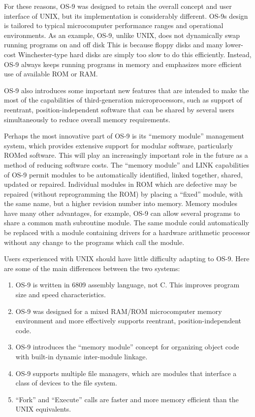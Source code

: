 \documentclass[
]{article}
\begin{document}
For these reasons, OS-9 was designed to retain the overall concept and
user interface of UNIX, but its implementation is considerably
different. OS-9\textquotesingle s design is tailored to typical
microcomputer performance ranges and operational environments. As an
example, OS-9, unlike UNIX, does not dynamically swap running programs
on and off disk This is because floppy disks and many lower-cost
Winchester-type hard disks are simply too slow to do this efficiently.
Instead, OS-9 always keeps running programs in memory and emphasizes
more efficient use of available ROM or RAM.

OS-9 also introduces some important new features that are intended to
make the most of the capabilities of third-generation microprocessors,
such as support of reentrant, position-independent software that can be
shared by several users simultaneously to reduce overall memory
requirements.

Perhaps the most innovative part of OS-9 is its ``memory module''
management system, which provides extensive support for modular
software, particularly ROMed software. This will play an increasingly
important role in the future as a method of reducing software costs. The
``memory module'' and LINK capabilities of OS-9 permit modules to be
automatically identified, linked together, shared, updated or repaired.
Individual modules in ROM which are defective may be repaired (without
reprogramming the ROM) by placing a ``fixed'' module, with the same
name, but a higher revision number into memory. Memory modules have many
other advantages, for example, OS-9 can allow several programs to share
a common math subroutine module. The same module could automatically be
replaced with a module containing drivers for a hardware arithmetic
processor without any change to the programs which call the module.

Users experienced with UNIX should have little difficulty adapting to
OS-9. Here are some of the main differences between the two systems:

\begin{enumerate}
\def\labelenumi{\arabic{enumi}.}
\item
  OS-9 is written in 6809 assembly language, not C. This improves
  program size and speed characteristics.
\item
  OS-9 was designed for a mixed RAM/ROM microcomputer memory environment
  and more effectively supports reentrant, position-independent code.
\item
  OS-9 introduces the ``memory module'' concept for organizing object
  code with built-in dynamic inter-module linkage.
\item
  OS-9 supports multiple file managers, which are modules that interface
  a class of devices to the file system.
\item
  ``Fork'' and ``Execute'' calls are faster and more memory efficient
  than the UNIX equivalents.
\end{enumerate}
\end{document}
